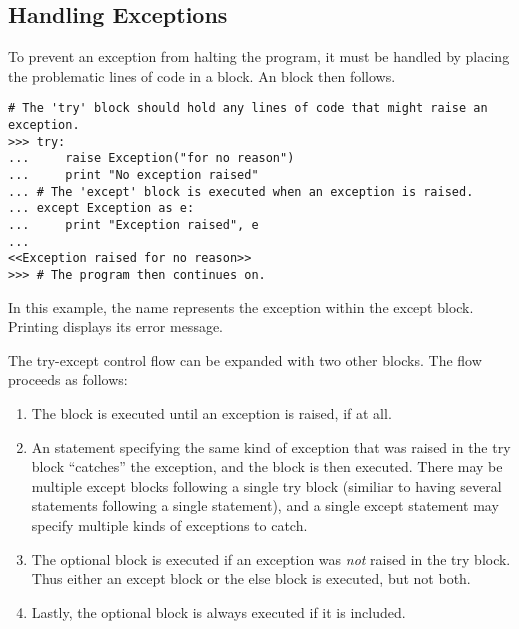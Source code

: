 \subsection*{Handling Exceptions} %

To prevent an exception from halting the program, it must be handled by
placing the problematic lines of code in a  block.
An  block then follows.

\begin{lstlisting}
# The 'try' block should hold any lines of code that might raise an exception.
>>> try:
...     raise Exception("for no reason")
...     print "No exception raised"
... # The 'except' block is executed when an exception is raised.
... except Exception as e:
...     print "Exception raised", e
...
<<Exception raised for no reason>>
>>> # The program then continues on.
\end{lstlisting}

In this example, the name  represents the exception within the except block.
Printing  displays its error message.

\begin{comment}
We could also raise the exception again with the syntax \li{raise e} or just \li{raise}.

\begin{lstlisting}
>>> try:
...     raise Exception("for no reason")
... except Exception as e:
...     print "Exception raised", e
...     e.args = ("BECAUSE MATH!!",)        # Assign 'e' a new error message.
...     raise e                             # Raise the exception again.
...
Exception raised for no reason
<<Traceback (most recent call last):
  File "<stdin>", line 6, in <module>
Exception: BECAUSE MATH!!>>
\end{lstlisting}
\end{comment}

\newpage

The try-except control flow can be expanded with two other blocks.
The flow proceeds as follows:

\begin{enumerate}
\item The  block is executed until an exception is raised, if at all.

\item An  statement specifying the same kind of exception that was raised in the try block ``catches'' the exception, and the block is then executed.
There may be multiple except blocks following a single try block (similiar to having several  statements following a single  statement), and a single except statement may specify multiple kinds of exceptions to catch.

\item The optional  block is executed if an exception was \emph{not} raised in the try block.
Thus either an except block or the else block is executed, but not both.

\item Lastly, the optional  block is always executed if it is included.
\end{enumerate}

